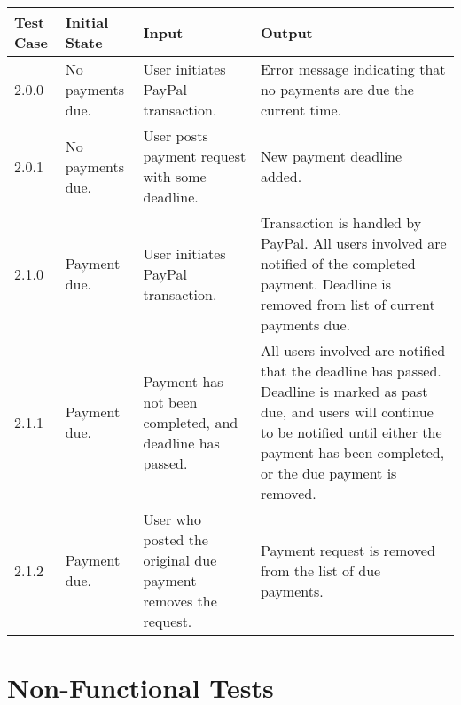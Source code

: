 \documentclass[12pt]{article}
\begin{document}
\begin{longtable}{|p{2cm}|p{3cm}|p{5cm}|p{5cm}|}
\hline
\textbf{Test Case} & \textbf{Initial State} & \textbf{Input} & \textbf{Output} \\ \hline
2.0.0 & No payments due. & User initiates PayPal transaction. & Error message indicating that no payments are due the current time.\\
\hline
2.0.1 & No payments due. & User posts payment request with some deadline. & New payment deadline added.\\
\hline
2.1.0 & Payment due. & User initiates PayPal transaction. & Transaction is handled by PayPal. All users involved are notified of the completed payment. Deadline is removed from list of current payments due.\\
\hline
2.1.1 & Payment due. & Payment has not been completed, and deadline has passed. & All users involved are notified that the deadline has passed. Deadline is marked as past due, and users will continue to be notified until either the payment has been completed, or the due payment is removed.\\
\hline
2.1.2 & Payment due. & User who posted the original due payment removes the request. & Payment request is removed from the list of due payments.\\
\hline
\end{longtable}


\section{Non-Functional Tests}
\end{document}
